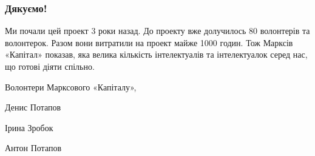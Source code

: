 \documentclass{kapital}
\begin{document}
{  \subsubsection*{Дякуємо!}

  Ми почали цей проект 3 роки назад. До проекту вже долучилось 80 волонтерів та волонтерок. Разом вони витратили на проект майже 1000 годин. Тож Марксів «Капітал» показав, яка велика кількість інтелектуалів та інтелектуалок серед нас, що готові діяти спільно. 

  \bigskip{}

  \noindent{}Волонтери Марксового «Капіталу»,

  \medskip{}

  \noindent{}Денис Потапов

  \noindent{}Ірина Зробок

  \noindent{}Антон Потапов
}
\end{document}
